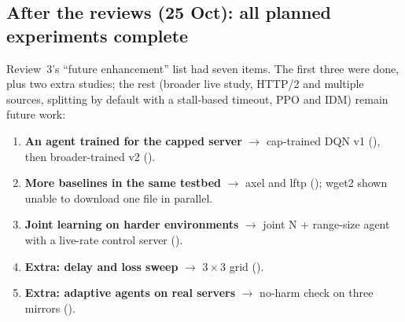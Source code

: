 \subsection{After the reviews (25 Oct): all planned experiments complete}
Review~3's ``future enhancement'' list had seven items. The first three were done, plus two extra studies; the rest (broader live study, HTTP/2 and multiple sources, splitting by default with a stall-based timeout, PPO and IDM) remain future work:
\begin{enumerate}
\item \textbf{An agent trained for the capped server} $\rightarrow$ cap-trained DQN v1 (), then broader-trained v2 ().
\item \textbf{More baselines in the same testbed} $\rightarrow$ axel and lftp (); wget2 shown unable to download one file in parallel.
\item \textbf{Joint learning on harder environments} $\rightarrow$ joint N + range-size agent with a live-rate control server ().
\item \textbf{Extra: delay and loss sweep} $\rightarrow$ $3\times3$ grid ().
\item \textbf{Extra: adaptive agents on real servers} $\rightarrow$ no-harm check on three mirrors ().
\end{enumerate}

